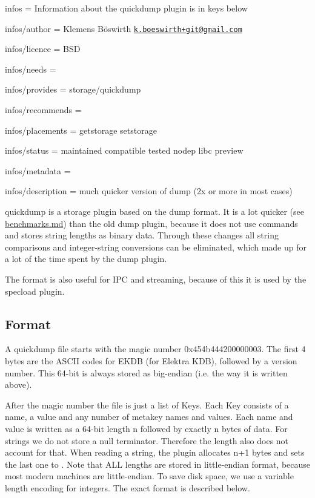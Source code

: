 
\begin{DoxyItemize}
\item infos = Information about the quickdump plugin is in keys below
\item infos/author = Klemens Böswirth \href{mailto:k.boeswirth+git@gmail.com}{\tt k.\+boeswirth+git@gmail.\+com}
\item infos/licence = B\+SD
\item infos/needs =
\item infos/provides = storage/quickdump
\item infos/recommends =
\item infos/placements = getstorage setstorage
\item infos/status = maintained compatible tested nodep libc preview
\item infos/metadata =
\item infos/description = much quicker version of dump (2x or more in most cases)
\end{DoxyItemize}

{\ttfamily quickdump} is a storage plugin based on the {\ttfamily dump} format. It is a lot quicker (see \hyperlink{md_src_plugins_quickdump_benchmarks_src_plugins_quickdump_benchmarks_md}{benchmarks.md}) than the old {\ttfamily dump} plugin, because it does not use commands and stores string lengths as binary data. Through these changes all string comparisons and integer-\/string conversions can be eliminated, which made up for a lot of the time spent by the {\ttfamily dump} plugin.

The format is also useful for I\+PC and streaming, because of this it is used by the {\ttfamily specload} plugin.

\subsection*{Format}

A {\ttfamily quickdump} file starts with the magic number {\ttfamily 0x454b444200000003}. The first 4 bytes are the A\+S\+C\+II codes for {\ttfamily E\+K\+DB} (for Elektra K\+DB), followed by a version number. This 64-\/bit is always stored as big-\/endian (i.\+e. the way it is written above).

After the magic number the file is just a list of Keys. Each Key consists of a name, a value and any number of metakey names and values. Each name and value is written as a 64-\/bit length {\ttfamily n} followed by exactly {\ttfamily n} bytes of data. For strings we do not store a null terminator. Therefore the length also does not account for that. When reading a string, the plugin allocates {\ttfamily n+1} bytes and sets the last one to {}. Note that A\+LL lengths are stored in little-\/endian format, because most modern machines are little-\/endian. To save disk space, we use a variable length encoding for integers. The exact format is described below.

